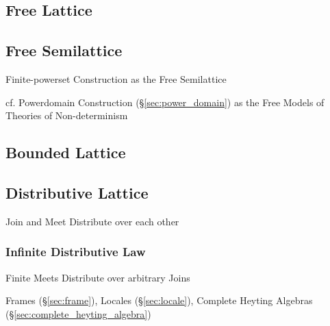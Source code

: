 \subsection{Free Lattice}\label{sec:free_lattice}

\subsection{Free Semilattice}\label{sec:free_semilattice}

Finite-powerset Construction as the Free Semilattice %

cf. Powerdomain Construction (\S\ref{sec:power_domain}) as the Free
Models of Theories of Non-determinism



\subsection{Bounded Lattice}\label{sec:bounded_lattice}

\subsection{Distributive Lattice}\label{sec:distributive_lattice}

Join and Meet Distribute over each other



\subsubsection{Infinite Distributive Law}
\label{sec:infinite_distributive}

Finite Meets Distribute over arbitrary Joins

Frames (\S\ref{sec:frame}), Locales (\S\ref{sec:locale}), Complete
Heyting Algebras (\S\ref{sec:complete_heyting_algebra})



